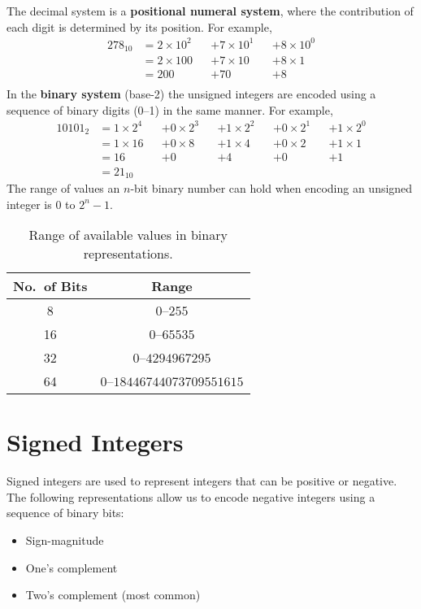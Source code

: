 \documentclass{report}
\begin{document}
The decimal system is a \textbf{positional numeral system}, where the
contribution of each digit is determined by its position. For example,
\begin{align*}
    278_{10} & = 2 \times 10^2 &  & + 7 \times 10^1 &  & + 8 \times 10^0 \\
             & = 2 \times 100  &  & + 7 \times 10   &  & + 8 \times 1    \\
             & = 200           &  & + 70            &  & + 8             \\
\end{align*}
In the \textbf{binary system} (base-2) the unsigned integers are encoded using a sequence of binary digits (0--1)
in the same manner. For example,
\begin{align*}
    10101_2 & = 1 \times 2^4 &  & + 0 \times 2^3 &  & + 1 \times 2^2 &  & + 0 \times 2^1 &  & + 1 \times 2^0 \\
            & = 1 \times 16  &  & + 0 \times 8   &  & + 1 \times 4   &  & + 0 \times 2   &  & + 1 \times 1   \\
            & = 16           &  & + 0            &  & + 4            &  & + 0            &  & + 1            \\
            & = 21_{10}
\end{align*}
The range of values an \(n\)-bit binary number can hold when encoding an unsigned integer is 0 to \(2^n - 1\).
\begin{table}[H]
    \centering
    \begin{tabular}{c c}
        \toprule
        \textbf{No.\ of Bits} & \textbf{Range}                        \\
        \midrule
        8                     & \(0\)--\(255\)                        \\
        16                    & \(0\)--\(\num{65535}\)                \\
        32                    & \(0\)--\(\num{4294967295}\)           \\
        64                    & \(0\)--\(\num{18446744073709551615}\) \\
        \bottomrule
    \end{tabular}
    \caption{Range of available values in binary representations.} %
\end{table}
\section{Signed Integers}
Signed integers are used to represent integers that can be positive or
negative. The following representations allow us to encode negative
integers using a sequence of binary bits:
\begin{itemize}
    \item Sign-magnitude
    \item One's complement
    \item Two's complement (most common)
\end{itemize}
\end{document}
